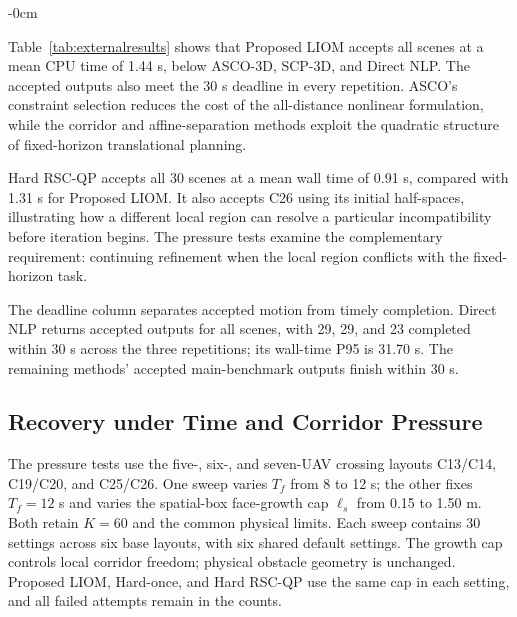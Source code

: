 \begin{table}[htbp]
\begin{adjustwidth}{-\extralength}{0cm}
\caption{Paired computational comparison on the 30 main-benchmark scenes. Proposed LIOM is the complete method developed in this paper.\label{tab:externalresults}}

\end{adjustwidth}
\end{table}

Table~\ref{tab:externalresults} shows that Proposed LIOM accepts all scenes at a mean CPU time of 1.44 s, below ASCO-3D, SCP-3D, and Direct NLP. The accepted outputs also meet the 30 s deadline in every repetition. ASCO's constraint selection reduces the cost of the all-distance nonlinear formulation, while the corridor and affine-separation methods exploit the quadratic structure of fixed-horizon translational planning.

Hard RSC-QP accepts all 30 scenes at a mean wall time of 0.91 s, compared with 1.31 s for Proposed LIOM. It also accepts C26 using its initial half-spaces, illustrating how a different local region can resolve a particular incompatibility before iteration begins. The pressure tests examine the complementary requirement: continuing refinement when the local region conflicts with the fixed-horizon task.

The deadline column separates accepted motion from timely completion. Direct NLP returns accepted outputs for all scenes, with 29, 29, and 23 completed within 30 s across the three repetitions; its wall-time P95 is 31.70 s. The remaining methods' accepted main-benchmark outputs finish within 30 s.

\subsection{Recovery under Time and Corridor Pressure}
\label{sec:stress}
The pressure tests use the five-, six-, and seven-UAV crossing layouts C13/C14, C19/C20, and C25/C26. One sweep varies $T_f$ from 8 to 12 s; the other fixes $T_f=12$ s and varies the spatial-box face-growth cap $\ell_s$ from 0.15 to 1.50 m. Both retain $K=60$ and the common physical limits. Each sweep contains 30 settings across six base layouts, with six shared default settings. The growth cap controls local corridor freedom; physical obstacle geometry is unchanged. Proposed LIOM, Hard-once, and Hard RSC-QP use the same cap in each setting, and all failed attempts remain in the counts.

